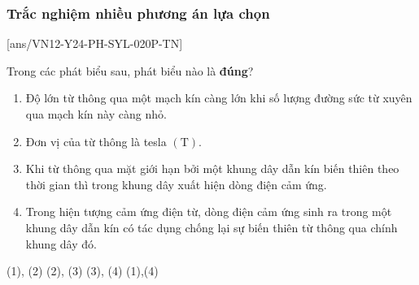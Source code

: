 \subsubsection{Trắc nghiệm nhiều phương án lựa chọn}
\setcounter{ex}{0}
[ans/VN12-Y24-PH-SYL-020P-TN]
\begin{ex}
	Trong các phát biểu sau, phát biểu nào là \textbf{đúng}?
	\begin{enumerate}[label=(\arabic*)]
		\item Độ lớn từ thông qua một mạch kín càng lớn khi số lượng đường sức từ xuyên qua mạch kín này càng nhỏ.
		\item Đơn vị của từ thông là tesla $\left(\si{\tesla}\right)$.
		\item Khi từ thông qua mặt giới hạn bởi một khung dây dẫn kín biến thiên theo thời gian thì trong khung dây xuất hiện dòng điện cảm ứng.
		\item Trong hiện tượng cảm ứng điện từ, dòng điện cảm ứng sinh ra trong một khung dây dẫn kín có tác dụng chống lại sự biến thiên từ thông qua chính khung dây đó.
	\end{enumerate}
	\choice
	{(1), (2)}
	{(2), (3)}
	{\True (3), (4)}
	{(1),(4)}
	\loigiai{
		
	}
\end{ex}

